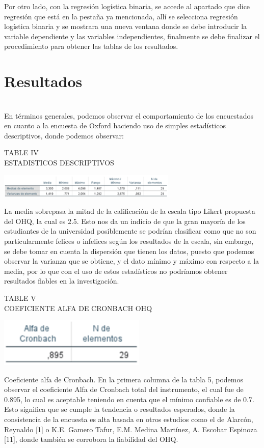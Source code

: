 \documentclass[conference]{IEEEtran}
\begin{document}
   Por otro lado, con la regresión logística binaria, se accede al apartado que dice regresión que está en la pestaña ya mencionada, allí se selecciona regresión logística binaria y se mostrara una nueva ventana donde se debe introducir la variable dependiente y las variables independientes, finalmente se debe finalizar el procedimiento para obtener las tablas de los resultados.\\

\section{Resultados}\\
 En términos generales, podemos observar el comportamiento de los encuestados en cuanto a la encuesta de Oxford haciendo uso de simples estadísticos descriptivos, donde podemos observar: \\
 \begin{center}
\caption{TABLE IV\\
ESTADISTICOS DESCRIPTIVOS}
\includegraphics[width=8.5cm]{imagenes/tabla5.png}
\end{center}
La media sobrepasa la mitad de la calificación de la escala tipo Likert propuesta del OHQ, la cual es 2.5. Esto nos da un indicio de que la gran mayoría de los estudiantes de la universidad posiblemente se podrían clasificar como que no son particularmente felices o infelices según los resultados de la escala, sin embargo, se debe tomar en cuenta la dispersión que tienen los datos, puesto que podemos observar la varianza que se obtiene, y el dato mínimo y máximo con respecto a la media, por lo que con el uso de estos estadísticos no podríamos obtener resultados fiables en la investigación.\\
\begin{center}
\caption{TABLE V\\
COEFICIENTE ALFA DE CRONBACH OHQ}
\includegraphics[width=7cm]{imagenes/tabla51.png}
\end{center}
Coeficiente alfa de Cronbach.  En la primera columna de la tabla 5, podemos observar el coeficiente Alfa de Cronbach total del instrumento, el cual fue de 0.895, lo cual es aceptable teniendo en cuenta que el mínimo confiable es de 0.7. Esto significa que se cumple la tendencia o resultados esperados, donde la consistencia de la encuesta es alta basada en otros estudios como el de Alarcón, Reynaldo [1] o  K.E. Gamero Tafur, E.M. Medina Martínez, A. Escobar Espinoza [11], donde también se corrobora la fiabilidad del OHQ.\\
\end{document}

